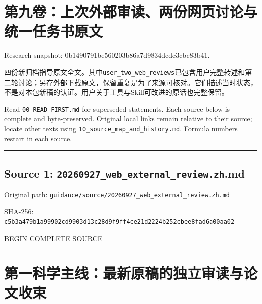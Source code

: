 \documentclass[
  10pt,
]{article}
\author{}
\date{}
\begin{document}
\hypertarget{ux7b2cux4e5dux5377ux4e0aux6b21ux5916ux90e8ux5ba1ux8bfbux4e24ux4efdux7f51ux9875ux8ba8ux8bbaux4e0eux7edfux4e00ux4efbux52a1ux4e66ux539fux6587}{%
\section{第九卷：上次外部审读、两份网页讨论与统一任务书原文}\label{ux7b2cux4e5dux5377ux4e0aux6b21ux5916ux90e8ux5ba1ux8bfbux4e24ux4efdux7f51ux9875ux8ba8ux8bbaux4e0eux7edfux4e00ux4efbux52a1ux4e66ux539fux6587}}

Research snapshot: 0b1490791be560203b86a7d9834dcdc3cbc83b41.

四份新归档指导原文全文。其中\nolinkurl{user_two_web_reviews}已包含用户完整转述和第二轮讨论；另存外部下载原文，保留重复是为了来源可核对。它们描述当时状态，不是对本包新稿的认证。用户关于工具与Skill可改进的原话也完整保留。

Read \nolinkurl{00_READ_FIRST.md} for superseded statements. Each source below is
complete and byte-preserved. Original local links remain relative to
their source; locate other texts using \nolinkurl{10_source_map_and_history.md}.
Formula numbers restart in each source.

\begin{center}\rule{0.5\linewidth}{0.5pt}\end{center}

\hypertarget{source-1-20260927_web_external_review.zh.md}{%
\subsection{Source 1:
\nolinkurl{20260927_web_external_review.zh}.md}\label{source-1-20260927_web_external_review.zh.md}}

Original path:
\nolinkurl{guidance/source/20260927_web_external_review.zh.md}

SHA-256:
\nolinkurl{c5b3a479b1a99902cd9903d13c28d9f9ff4ce21d2224b252cbee8fad6a00aa02}

BEGIN COMPLETE SOURCE

\hypertarget{ux7b2cux4e00ux79d1ux5b66ux4e3bux7ebfux6700ux65b0ux539fux7a3fux7684ux72ecux7acbux5ba1ux8bfbux4e0eux8bbaux6587ux6536ux675f}{%
\section{第一科学主线：最新原稿的独立审读与论文收束}\label{ux7b2cux4e00ux79d1ux5b66ux4e3bux7ebfux6700ux65b0ux539fux7a3fux7684ux72ecux7acbux5ba1ux8bfbux4e0eux8bbaux6587ux6536ux675f}}
\end{document}
